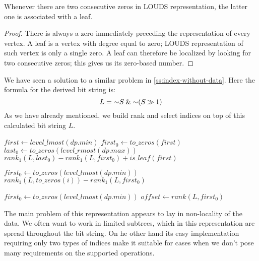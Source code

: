 \begin{lemma}
	Whenever there are two consecutive zeros in LOUDS representation, the latter one is associated with a leaf.
\end{lemma}
\begin{proof}
	There is always a zero immediately preceding the representation of every vertex.
	A leaf is a vertex with degree equal to zero; LOUDS representation of such vertex is only a single zero.
	A leaf can therefore be localized by looking for two consecutive zeros; this gives us its zero-based number.
\end{proof}

We have seen a solution to a similar problem in \ref{ss:index-without-data}.
Here the formula for the derived bit string is:
$$L = \mathord{\sim} S \mathbin{\&} \mathord{\sim} (S \mathbin{\gg} 1)$$
As we have already mentioned, we build rank and select indices on top of this calculated bit string $L$.

\begin{algorithmic}
	\State $first \gets level\_lmost(dp.min)$ 
	\State $first_0 \gets to\_zeros(first)$
	\State $last_0 \gets to\_zeros(level\_rmost(dp.max))$
	\State \Return $rank_1(L, last_0) - rank_1(L, first_0) + is\_leaf(first)$
\EndFunction
\end{algorithmic}

\begin{algorithmic}	
		\State {}
		\State {}
	\Else
		\State $first_0 \gets to\_zeros(level\_lmost(dp.min))$
		\State $rank_1(L, to\_zeros(i)) - rank_1(L, first_0)$
	\EndIf
\EndFunction
\end{algorithmic}

\begin{algorithmic}
		\State {}
	\Else
		\State $first_0 \gets to\_zeros(level\_lmost(dp.min))$
		\State $offset \gets rank(L, first_0)$
		\State {}
	\EndIf
\EndFunction
\end{algorithmic}

\bigskip

The main problem of this representation appears to lay in non-locality of the data.
We often want to work in limited subtrees, which in this representation are spread throughout the bit string.
On he other hand its easy implementation requiring only two types of indices make it suitable for cases when we don't pose many requirements on the supported operations.

